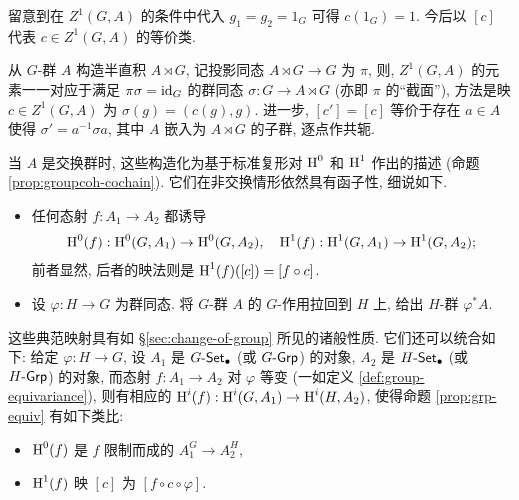 留意到在 $Z^1(G, A)$ 的条件中代入 $g_1 = g_2 = 1_G$ 可得 $c(1_G) = 1$. 今后以 $[c]$ 代表 $c \in Z^1(G, A)$ 的等价类.

\begin{remark}[$\Hm^1$ 作为截面的共轭类]\label{rem:Z1-vs-section}
	从 $G$-群 $A$ 构造半直积 $A \rtimes G$, 记投影同态 $A \rtimes G \to G$ 为 $\pi$, 则, $Z^1(G, A)$ 的元素一一对应于满足 $\pi \sigma = \mathrm{id}_G$ 的群同态 $\sigma: G \to A \rtimes G$ (亦即 $\pi$ 的``截面''), 方法是映 $c \in Z^1(G, A)$ 为 $\sigma(g) = (c(g), g)$. 进一步, $[c'] = [c]$ 等价于存在 $a \in A$ 使得 $\sigma' = a^{-1} \sigma a$, 其中 $A$ 嵌入为 $A \rtimes G$ 的子群, 逐点作共轭.
\end{remark}

当 $A$ 是交换群时, 这些构造化为基于标准复形对 $\operatorname{H}^0$ 和 $\Hm^1$ 作出的描述 (命题 \ref{prop:groupcoh-cochain}). 它们在非交换情形依然具有函子性, 细说如下.
\begin{itemize}
	\item 任何态射 $f: A_1 \to A_2$ 都诱导
	\begin{gather*}
		\operatorname{H}^0(f): \operatorname{H}^0(G, A_1) \to \operatorname{H}^0(G, A_2), \quad
		\operatorname{H}^1(f): \operatorname{H}^1(G, A_1) \to \operatorname{H}^1(G, A_2);
	\end{gather*}
	前者显然, 后者的映法则是 $\operatorname{H}^1(f)([c]) = [f \circ c]$.
	
	\item 设 $\varphi: H \to G$ 为群同态. 将 $G$-群 $A$ 的 $G$-作用拉回到 $H$ 上, 给出 $H$-群 $\varphi^* A$.
\end{itemize}

这些典范映射具有如 \S\ref{sec:change-of-group} 所见的诸般性质. 它们还可以统合如下: 给定 $\varphi: H \to G$, 设 $A_1$ 是 $G\text{-}\mathsf{Set}_\bullet$ (或 $G\text{-}\mathsf{Grp}$) 的对象, $A_2$ 是 $H\text{-}\mathsf{Set}_\bullet$ (或 $H\text{-}\mathsf{Grp}$) 的对象, 而态射 $f: A_1 \to A_2$ 对 $\varphi$ 等变 (一如定义 \ref{def:group-equivariance}), 则有相应的 $\operatorname{H}^i(f): \operatorname{H}^i(G, A_1) \to \operatorname{H}^i(H, A_2)$, 使得命题 \ref{prop:grp-equiv} 有如下类比:
\begin{itemize}
	\item $\operatorname{H}^0(f)$ 是 $f$ 限制而成的 $A_1^G \to A_2^H$,
	\item $\operatorname{H}^1(f)$ 映 $[c]$ 为 $[f \circ c \circ \varphi]$.
\end{itemize}


